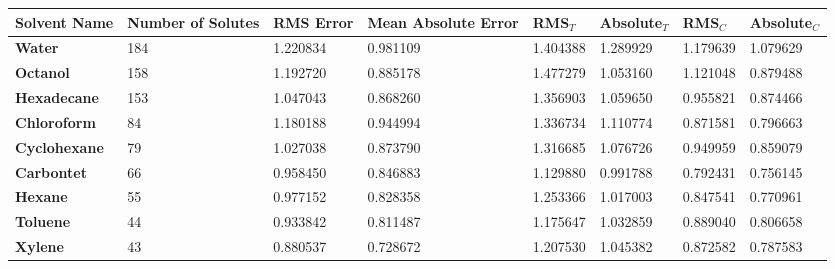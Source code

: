\documentclass{amsart}
\begin{document}
 
\begin{center}
\begin{tabular}{|l|l|l|l|l|l|l|l|} 
\hline  
\textbf{Solvent Name}&\textbf{Number of Solutes}&\textbf{RMS Error}&\textbf{Mean Absolute Error}&\textbf{RMS$_{T}$}&\textbf{Absolute$_{T}$}&\textbf{RMS$_{C}$}&\textbf{Absolute$_{C}$} \\ \hline
\hline 
\textbf{Water}&184&1.220834&0.981109&1.404388&1.289929&1.179639&1.079629 \\ \hline 
\textbf{Octanol}&158&1.192720&0.885178&1.477279&1.053160&1.121048&0.879488 \\ \hline 
\textbf{Hexadecane}&153&1.047043&0.868260&1.356903&1.059650&0.955821&0.874466 \\ \hline 
\textbf{Chloroform}& 84&1.180188&0.944994&1.336734&1.110774&0.871581&0.796663 \\ \hline 
\textbf{Cyclohexane}& 79&1.027038&0.873790&1.316685&1.076726&0.949959&0.859079 \\ \hline 
\textbf{Carbontet}& 66&0.958450&0.846883&1.129880&0.991788&0.792431&0.756145 \\ \hline 
\textbf{Hexane}& 55&0.977152&0.828358&1.253366&1.017003&0.847541&0.770961 \\ \hline 
\textbf{Toluene}& 44&0.933842&0.811487&1.175647&1.032859&0.889040&0.806658 \\ \hline 
\textbf{Xylene}& 43&0.880537&0.728672&1.207530&1.045382&0.872582&0.787583 \\ \hline 
\end{tabular} 
\end{center} 
\end{document}
